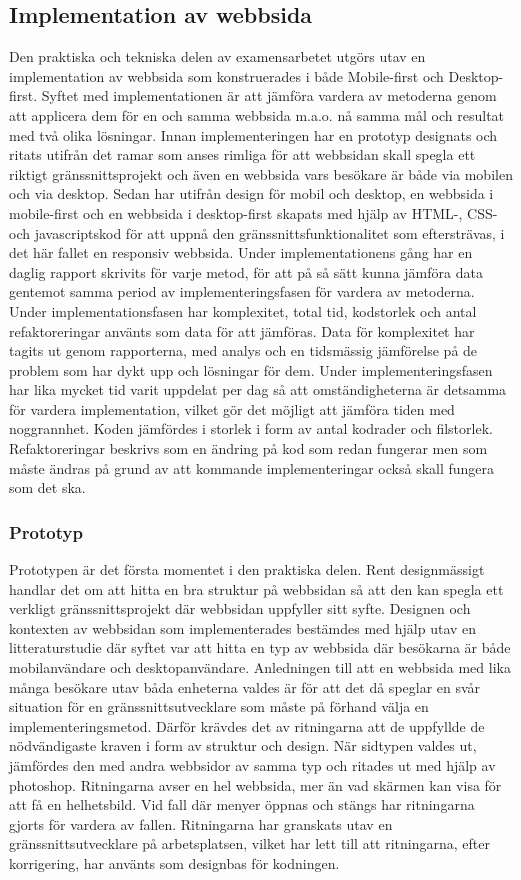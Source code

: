 \documentclass[11pt]{article}
\begin{document}
\subsection{Implementation av webbsida}
Den praktiska och tekniska delen av examensarbetet utgörs utav en implementation av webbsida som konstruerades i både Mobile-first och Desktop-first. Syftet med implementationen är att jämföra vardera av metoderna genom att applicera dem för en och samma webbsida m.a.o. nå samma mål och resultat med två olika lösningar. Innan implementeringen har en prototyp designats och ritats utifrån det ramar som anses rimliga för att webbsidan skall spegla ett riktigt gränssnittsprojekt och även en webbsida vars besökare är både via mobilen och via desktop. Sedan har utifrån design för mobil och desktop, en webbsida i mobile-first och en webbsida i desktop-first skapats med hjälp av HTML-, CSS- och javascriptskod för att uppnå den gränssnittsfunktionalitet som eftersträvas, i det här fallet en responsiv webbsida. Under implementationens gång har en daglig rapport skrivits för varje metod, för att på så sätt kunna jämföra data gentemot samma period av implementeringsfasen för vardera av metoderna. Under implementationsfasen har komplexitet, total tid, kodstorlek och antal refaktoreringar använts som data för att jämföras.  Data för komplexitet har tagits ut genom rapporterna, med analys och en tidsmässig jämförelse på de problem som har dykt upp och lösningar för dem. Under implementeringsfasen har lika mycket tid varit uppdelat per dag så att omständigheterna är detsamma för vardera implementation, vilket gör det möjligt att jämföra tiden med noggrannhet. Koden jämfördes i storlek i form av antal kodrader och filstorlek. Refaktoreringar beskrivs som en ändring på kod som redan fungerar men som måste ändras på grund av att kommande implementeringar också skall fungera som det ska. 

\subsubsection{Prototyp}
Prototypen är det första momentet i den praktiska delen. Rent designmässigt handlar det om att hitta en bra struktur på webbsidan så att den kan spegla ett verkligt gränssnittsprojekt där webbsidan uppfyller sitt syfte. Designen och kontexten av webbsidan som implementerades bestämdes med hjälp utav en litteraturstudie där syftet var att hitta en typ av webbsida där besökarna är både mobilanvändare och desktopanvändare. Anledningen till att en webbsida med lika många besökare utav båda enheterna valdes är för att det då speglar en svår situation för en gränssnittsutvecklare som måste på förhand välja en implementeringsmetod. Därför krävdes det av ritningarna att de uppfyllde de nödvändigaste kraven i form av struktur och design. När sidtypen valdes ut, jämfördes den med andra webbsidor av samma typ och ritades ut med hjälp av photoshop. Ritningarna avser en hel webbsida, mer än vad skärmen kan visa för att få en helhetsbild. Vid fall där menyer öppnas och stängs har ritningarna gjorts för vardera av fallen. Ritningarna har granskats utav en gränssnittsutvecklare på arbetsplatsen, vilket har lett till att ritningarna, efter korrigering, har använts som designbas för kodningen. 
  
\end{document}
